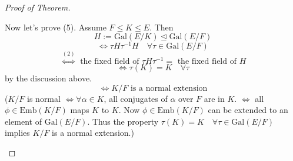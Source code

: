 \documentclass{article}
\theoremstyle{definition}
\newenvironment{proofs}[1][\proofname]{%
  \begin{proof}[#1]$ $\par\nobreak\ignorespaces
}{%
  \end{proof}
}
\newcommand{\Lra}{\Leftrightarrow}
\begin{document}
\begin{proofs}[Proof of Theorem]
\begin{enumerate}
			Now let's prove (5).
			Assume $F \leq K \leq E$.
			Then 
			\[
				H := \text{Gal}(E/K) \trianglelefteq \text{Gal}(E/F)
			\]
			\[
				\Lra \tau H \tau^{-1} H \quad \forall \tau \in \text{Gal}(E/F)
			\]
			\[
				\stackrel{(2)}{\Lra} \text{ the fixed field of } \tau H \tau^{-1} = \text{ the fixed field of }H
			\]
			\[
				\Lra \tau(K) = K \quad \forall \tau
			\]
			by the discussion above.
			\[
				\Lra K/F \text{ is a normal extension}
			\]
			($K/F$ is normal $\Lra \forall \alpha \in K$, all conjugates of $\alpha$ over $F$ are in $K$.
			$\Lra$ all $\phi \in \text{Emb}(K/F)$ maps $K$ to $K$.
			Now $\phi \in \text{Emb}(K/F)$ can be extended to an element of $\text{Gal}(E/F)$.
			Thus the property $\tau(K) = K \quad \forall \tau \in \text{Gal}(E/F)$ implies $K/F$ is a normal extension.)
	\end{enumerate}
\end{proofs}
\end{document}
